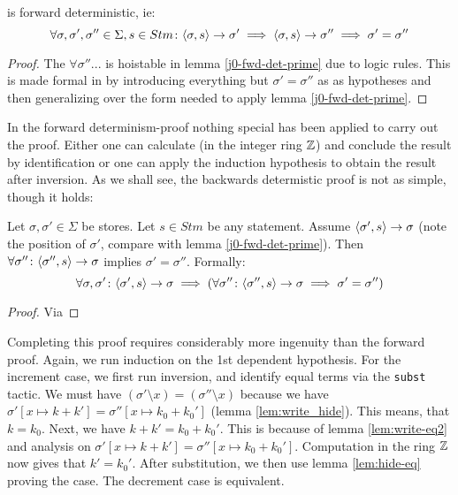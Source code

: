 \begin{thm}
\label{thm:j0-fwd-det}
  \janusz{} is forward deterministic, ie:
  \begin{equation*}
    \forall \sigma, \sigma', \sigma'' \in \Sigma, s \in Stm \colon \langle \sigma, s \rangle -> \sigma' \implies \langle \sigma, s \rangle -> \sigma'' \implies \sigma' = \sigma''
  \end{equation*}
\end{thm}
\begin{proof}
  The $\forall \sigma''...$ is hoistable in lemma
  \eqref{j0-fwd-det-prime} due to logic rules. This is made formal in
  \coq{} by introducing everything but $\sigma' = \sigma''$ as as
  hypotheses and then generalizing over the form needed to apply lemma
  \eqref{j0-fwd-det-prime}.
\end{proof}

In the forward determinism-proof nothing special has been applied to
carry out the proof. Either one can calculate (in the integer ring
$\mathbb{Z}$) and conclude the result by identification or one can apply the
induction hypothesis to obtain the result after inversion. As we shall
see, the backwards determistic proof is not as simple, though it
holds:

\begin{lem}
  Let $\sigma, \sigma' \in \Sigma$ be stores. Let $s \in Stm$ be any
  statement. Assume $\langle \sigma', s \rangle -> \sigma$ (note the position of
  $\sigma'$, compare with lemma \eqref{j0-fwd-det-prime}). Then
  $\forall \sigma'' \colon \langle \sigma'', s \rangle -> \sigma$ implies $\sigma' =
  \sigma''$. Formally:
  \begin{equation*}
    \forall \sigma, \sigma' \colon \langle \sigma', s \rangle -> \sigma \implies
    (\forall \sigma'' \colon \langle \sigma'', s \rangle -> \sigma \implies \sigma'
    = \sigma'')
  \end{equation*}
\end{lem}
\begin{proof}
  Via \coq{}
\end{proof}

Completing this proof requires considerably more ingenuity than the
forward proof. Again, we run induction on the 1st dependent
hypothesis. For the increment case, we first run inversion, and
identify equal terms via the \texttt{subst} tactic. We must have
$(\sigma' \setminus x) = (\sigma'' \setminus x)$ because we have
$\sigma'[x \mapsto k + k'] = \sigma''[x \mapsto k_0 + k_0']$ (lemma
\eqref{lem:write_hide}). This means, that $k = k_0$. Next, we have $k
+ k' = k_0 + k_0'$. This is because of lemma \eqref{lem:write-eq2} and
analysis on $\sigma'[x \mapsto k + k'] = \sigma''[x \mapsto k_0 +
k_0']$. Computation in the ring $\mathbb{Z}$ now gives that $k' =
k_0'$. After substitution, we then use lemma \eqref{lem:hide-eq}
proving the case. The decrement case is equivalent.

